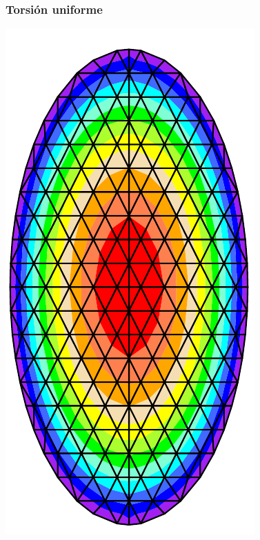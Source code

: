 \documentclass[handout]{beamer}
\begin{document}
\begin{frame}
\frametitle{Torsión uniforme}
\begin{center}
\includegraphics[height=0.95\textheight]{torsion_uni.pdf}
\end{center}
\end{frame}
\end{document}
